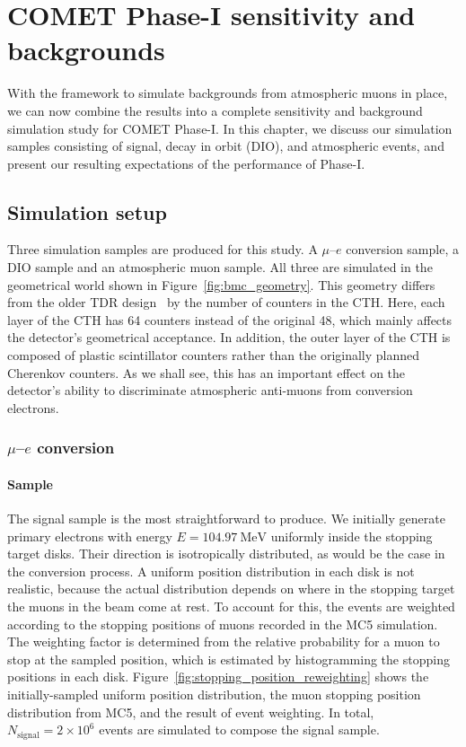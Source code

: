 \chapter{COMET Phase-I sensitivity and backgrounds}

With the framework to simulate backgrounds from atmospheric muons in place, we
can now combine the results into a complete sensitivity and background
simulation study for COMET Phase-I. In this chapter, we discuss our simulation
samples consisting of signal, decay in orbit (DIO), and atmospheric events, and
present our resulting expectations of the performance of Phase-I.

\section{Simulation setup}
Three simulation samples are produced for this study. A $\mu$--$e$ conversion
sample, a DIO sample and an atmospheric muon sample. All three are simulated in
the geometrical world shown in Figure~\ref{fig:bmc_geometry}. This geometry
differs from the older TDR design~\cite{the_comet_collaboration_comet_2020} by
the number of counters in the CTH. Here, each layer of the CTH has 64 counters
instead of the original 48, which mainly affects the detector's geometrical
acceptance. In addition, the outer layer of the CTH is composed of plastic
scintillator counters rather than the originally planned Cherenkov counters. As
we shall see, this has an important effect on the detector's ability to
discriminate atmospheric anti-muons from conversion electrons.

\subsection{\texorpdfstring{$\mu$--$e$}{Muon to electron} conversion} 

\subsubsection{Sample}

The signal sample is the most straightforward to produce. We initially generate
primary electrons with energy $E=\SI{104.97}{\MeV}$ uniformly inside the
stopping target disks. Their direction is isotropically distributed, as would be
the case in the conversion process. A uniform position distribution in each disk
is not realistic, because the actual distribution depends on where in the
stopping target the muons in the beam come at rest. To account for this, the
events are weighted according to the stopping positions of muons recorded in the
MC5 simulation. The weighting factor is determined from the relative probability
for a muon to stop at the sampled position, which is estimated by histogramming
the stopping positions in each disk.
Figure~\ref{fig:stopping_position_reweighting} shows the initially-sampled
uniform position distribution, the muon stopping position distribution from MC5,
and the result of event weighting. In total, $N_\mathrm{signal} =
2\times 10^6$ events are simulated to compose the signal sample.

